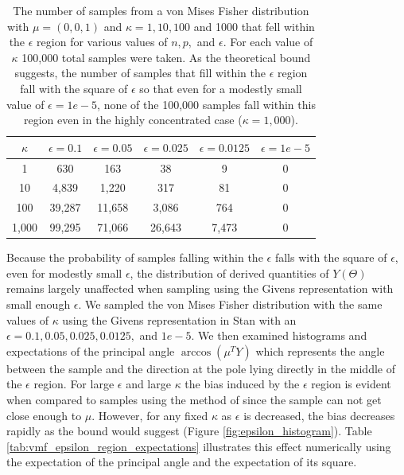 \documentclass[ba]{imsart}
\numberwithin{equation}{section}
\theoremstyle{plain}
\begin{document}
\begin{table}
\begin{tabular}{|c||ccccc|}
\hline
$\kappa$  & $\epsilon = 0.1$ & $\epsilon = 0.05$ & $\epsilon = 0.025$ & $\epsilon = 0.0125$ & $\epsilon = 1e-5$\\
\hline
\hline
1 & 630 & 163 & 38 & 9 & 0\\
10 & 4,839 & 1,220 & 317 & 81 & 0\\
100 & 39,287 & 11,658 & 3,086 & 764 & 0 \\
1,000  & 99,295 & 71,066 & 26,643 & 7,473 & 0 \\
\hline
\end{tabular}
\caption{The number of samples from a von Mises Fisher distribution with $\mu = (0,0,1)$ and $\kappa = 1, 10, 100$ and 1000 that fell within the $\epsilon$ region for various values of $n, p,$ and $\epsilon$. For each value of $\kappa$ 100,000 total samples were taken. As the theoretical bound suggests, the number of samples that fill within the $\epsilon$ region fall with the square of $\epsilon$ so that even for a modestly small value of $\epsilon = 1e-5$, none of the 100,000 samples fall within this region even in the highly concentrated case ($\kappa = 1,000$).}
\label{tab:vmf_epsilon_region}
\end{table}

\noindent Because the probability of samples falling within the $\epsilon$ falls with the square of $\epsilon$, even for modestly small $\epsilon$, the distribution of derived quantities of $Y(\Theta)$ remains largely unaffected when sampling using the Givens representation with small enough $\epsilon$. We sampled the von Mises Fisher distribution with the same values of $\kappa$ using the Givens representation in Stan with an $\epsilon = 0.1, 0.05, 0.025, 0.0125,$ and $1e-5$. We then examined histograms and expectations of the principal angle $\arccos (\mu^T Y)$ which represents the angle between the sample and the direction at the pole lying directly in the middle of the $\epsilon$ region. For large $\epsilon$ and large $\kappa$ the bias induced by the $\epsilon$ region is evident when compared to samples using the method of \citet{wood1994simulation} since the sample can not get close enough to $\mu$. However, for any fixed $\kappa$ as $\epsilon$ is decreased, the bias decreases rapidly as the bound would suggest (Figure \ref{fig:epsilon_histogram}). Table \ref{tab:vmf_epsilon_region_expectations} illustrates this effect numerically using the expectation of the principal angle and the expectation of its square.
\end{document}
